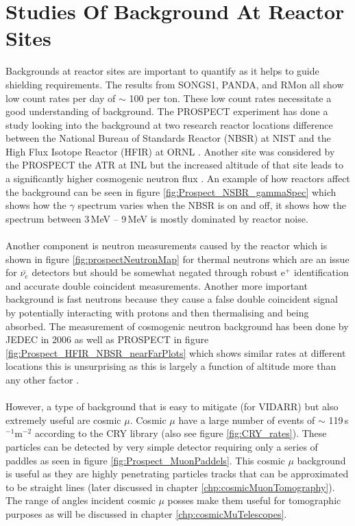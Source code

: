 \section{Studies Of Background At Reactor Sites}
Backgrounds at reactor sites are important to quantify as it helps to guide shielding requirements. The results from SONGS1, PANDA, and RMon all show low count rates per day of $\sim$ 100 per ton. These low count rates necessitate a good understanding of background. The PROSPECT experiment has done a  study looking into the background at two research reactor locations difference between the National Bureau of Standards Reactor (NBSR) at NIST and the High Flux Isotope Reactor (HFIR) at ORNL \cite{Ashenfelter_2016}. Another site was considered by the PROSPECT the ATR at INL but the increased altitude of that site leads to a significantly higher cosmogenic neutron flux \cite{Ashenfelter_2016}. An example of how reactors affect the background can be seen in figure \ref{fig:Prospect_NSBR_gammaSpec} which shows how the $\gamma$ spectrum varies when the NBSR is on and off, it shows how the spectrum between 3\,MeV -- 9\,MeV is mostly dominated by reactor noise. 
\\\\Another component is neutron measurements caused by the reactor which is shown in figure \ref{fig:prospectNeutronMap} for thermal neutrons which are an issue for $\bar{\nu_e}$ detectors but should be somewhat negated through robust e$^+$ identification and accurate double coincident measurements. Another more important background is fast neutrons because they cause a false double coincident signal by potentially interacting with protons and then thermalising and being absorbed. The measurement of cosmogenic neutron background has been done by JEDEC in 2006 \cite{JEDEC_2006} as well as PROSPECT in figure \ref{fig:Prospect_HFIR_NBSR_nearFarPlots} which shows similar rates at different locations this is unsurprising as this is largely a function of altitude more than any other factor \cite{Ashenfelter_2016}. \\\\However, a type of background that is easy to mitigate (for VIDARR) but also extremely useful are cosmic $\mu$. Cosmic $\mu$ have a large number of events of $\sim$ 119\,s$^{-1}$m$^{-2}$ according to the CRY library \cite{ieee_cry_2007} (also see figure \ref{fig:CRY_rates}). These particles can be detected by very simple detector requiring only a series of paddles as seen in figure \ref{fig:Prospect_MuonPaddels}. This cosmic $\mu$ background is useful as they are highly penetrating particles tracks that can be approximated to be straight lines (later discussed in chapter \ref{chp:cosmicMuonTomography}). The range of angles incident cosmic $\mu$ posses make them useful for tomographic purposes as will be discussed in chapter \ref{chp:cosmicMuTelescopes}. %


